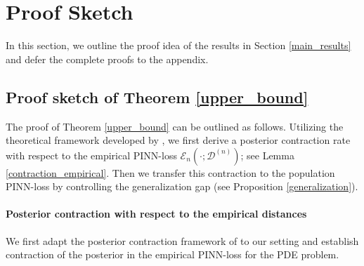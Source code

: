 \documentclass{article}
\newcommand{\F}{\mathcal{F}}
\newcommand{\D}{\mathcal{D}}
\theoremstyle{plain}
\theoremstyle{definition}
\theoremstyle{remark}
\begin{document}
\section{Proof Sketch}

In this section, we outline the proof idea of the results in Section \ref{main_results} and defer the complete proofs to the appendix.

\subsection{Proof sketch of Theorem \ref{upper_bound}} \label{proof sketch_upper_bound}

The proof of Theorem \ref{upper_bound} can be outlined as follows.   Utilizing the theoretical framework developed by \cite{ghosal2007convergence}, we first derive a posterior contraction rate with respect to the empirical PINN-loss $\mathcal{E}_n(\cdot; \D^{(n)})$; see Lemma \ref{contraction_empirical}. Then we transfer this contraction to the population PINN-loss by controlling the generalization gap (see Proposition \ref{generalization}).  



\paragraph{Posterior contraction with respect to the empirical distances}

We first adapt the posterior contraction framework of \cite{ghosal2007convergence} to our setting and establish contraction of the posterior in the empirical PINN-loss for the PDE problem.

\end{document}
